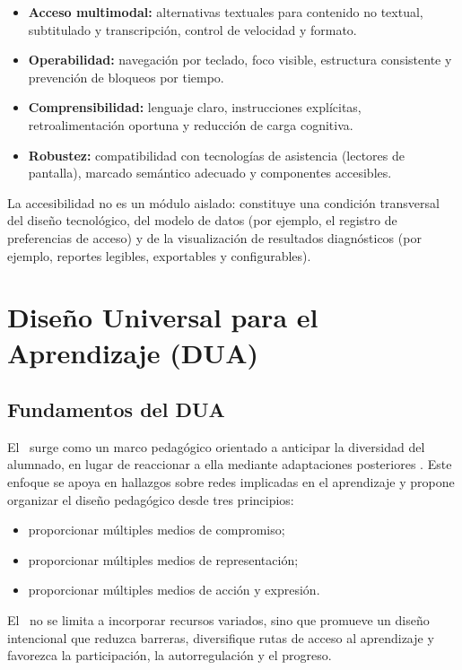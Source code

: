 \begin{refsection}
\begin{itemize}
\item \textbf{Acceso multimodal:} alternativas textuales para contenido no textual, subtitulado y transcripción, control de velocidad y formato.
\item \textbf{Operabilidad:} navegación por teclado, foco visible, estructura consistente y prevención de bloqueos por tiempo.
\item \textbf{Comprensibilidad:} lenguaje claro, instrucciones explícitas, retroalimentación oportuna y reducción de carga cognitiva.
\item \textbf{Robustez:} compatibilidad con tecnologías de asistencia (lectores de pantalla), marcado semántico adecuado y componentes accesibles.
\end{itemize}

La accesibilidad no es un módulo aislado: constituye una condición transversal del diseño tecnológico, del modelo de datos (por ejemplo, el registro de preferencias de acceso) y de la visualización de resultados diagnósticos (por ejemplo, reportes legibles, exportables y configurables).

\section{Diseño Universal para el Aprendizaje (DUA)}

\subsection{Fundamentos del DUA}

El \DUA\ surge como un marco pedagógico orientado a anticipar la diversidad del alumnado, en lugar de reaccionar a ella mediante adaptaciones posteriores \parencite{cast2018,meyer2014}. Este enfoque se apoya en hallazgos sobre redes implicadas en el aprendizaje y propone organizar el diseño pedagógico desde tres principios:

\begin{itemize}
\item proporcionar múltiples medios de compromiso;
\item proporcionar múltiples medios de representación;
\item proporcionar múltiples medios de acción y expresión.
\end{itemize}

El \DUA\ no se limita a incorporar recursos variados, sino que promueve un diseño intencional que reduzca barreras, diversifique rutas de acceso al aprendizaje y favorezca la participación, la autorregulación y el progreso.


\end{refsection}
